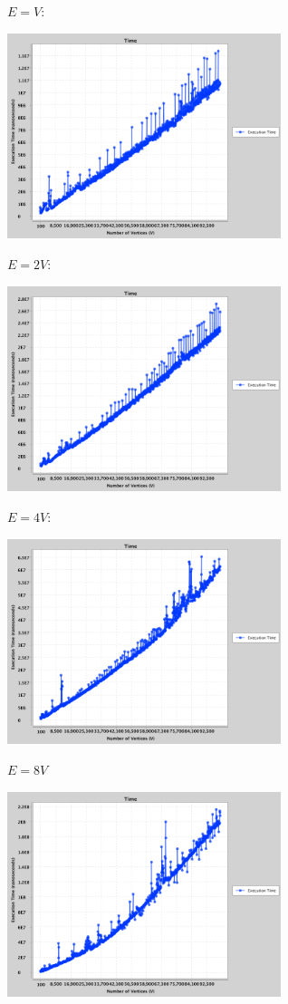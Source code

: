 \documentclass{article}
\begin{document}
\begin{enumerate}
    $E = V$: 
        \begin{center}
        \includegraphics[width=0.6\textwidth]{g4.png}
        \end{center}
    $E = 2V$: 
        \begin{center}
        \includegraphics[width=0.6\textwidth]{g5.png}
        \end{center}
        $E = 4V$: 
        \begin{center}
        \includegraphics[width=0.6\textwidth]{g6.png}
        \end{center}
    $E = 8V$ 
                    \begin{center}
        \includegraphics[width=0.6\textwidth]{g7.png}
        \end{center}
\end{enumerate}
\end{document}
